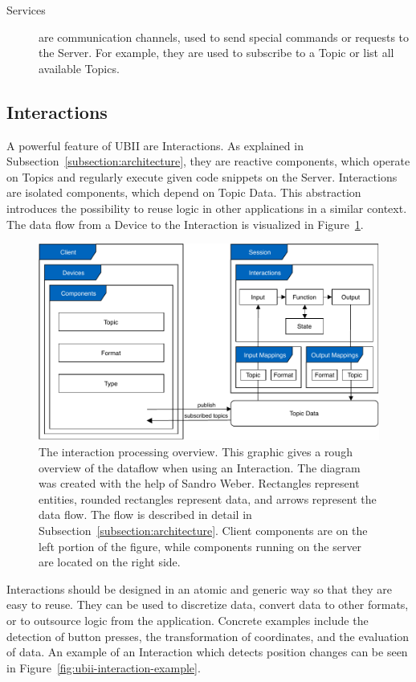 \begin{description}
	\item[Services] are communication channels, used to send special commands or requests to the Server. For example, they are used to subscribe to a Topic or list all available Topics.
\end{description}


\subsection{Interactions}\label{subsection:interactions}
A powerful feature of \gls{UBII} are Interactions. As explained in Subsection~\ref{subsection:architecture}, they are reactive components, which operate on Topics and regularly execute given code snippets on the Server. Interactions are isolated components, which depend on Topic Data. This abstraction introduces the possibility to reuse logic in other applications in a similar context. The data flow from a Device to the Interaction is visualized in Figure~\ref{fig:ubii-cd}.

\begin{figure}[H]
	\centering
	\includegraphics[width=12cm]{figures/implementation/ubii_cd.pdf}
	\caption[UBII communication diagram]{The interaction processing overview. This graphic gives a rough overview of the dataflow when using an Interaction. The diagram was created with the help of Sandro Weber. Rectangles represent entities, rounded rectangles represent data, and arrows represent the data flow. The flow is described in detail in Subsection~\ref{subsection:architecture}. Client components are on the left portion of the figure, while components running on the server are located on the right side.}\label{fig:ubii-cd}
\end{figure}

Interactions should be designed in an atomic and generic way so that they are easy to reuse. They can be used to discretize data, convert data to other formats, or to outsource logic from the application. Concrete examples include the detection of button presses, the transformation of coordinates, and the evaluation of data. An example of an Interaction which detects position changes can be seen in Figure~\ref{fig:ubii-interaction-example}.

